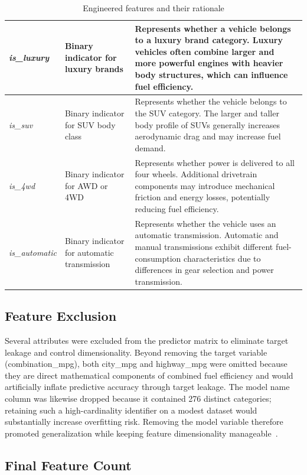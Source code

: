 \begin{table}[H]
{\begin{tabular}{|p{6.0cm}|p{4.5cm}|p{8.5cm}|}
\textit{is\_luxury} &
Binary indicator for luxury brands &
Represents whether a vehicle belongs to a luxury brand category. Luxury vehicles often combine larger and more powerful engines with heavier body structures, which can influence fuel efficiency. \\
\hline

\textit{is\_suv} &
Binary indicator for SUV body class &
Represents whether the vehicle belongs to the SUV category. The larger and taller body profile of SUVs generally increases aerodynamic drag and may increase fuel demand. \\
\hline

\textit{is\_4wd} &
Binary indicator for AWD or 4WD &
Represents whether power is delivered to all four wheels. Additional drivetrain components may introduce mechanical friction and energy losses, potentially reducing fuel efficiency. \\
\hline

\textit{is\_automatic} &
Binary indicator for automatic transmission &
Represents whether the vehicle uses an automatic transmission. Automatic and manual transmissions exhibit different fuel-consumption characteristics due to differences in gear selection and power transmission. \\
\hline

\end{tabular}%
}
\caption{Engineered features and their rationale}
\label{tab:engineered_features}
\end{table}


\subsection{Feature Exclusion}

Several attributes were excluded from the predictor matrix to eliminate target leakage and control dimensionality. Beyond removing the target variable (combination\_mpg), both city\_mpg and highway\_mpg were omitted because they are direct mathematical components of combined fuel efficiency and would artificially inflate predictive accuracy through target leakage. The model name column was likewise dropped because it contained 276 distinct categories; retaining such a high-cardinality identifier on a modest dataset would substantially increase overfitting risk. Removing the model variable therefore promoted generalization while keeping feature dimensionality manageable~\cite{atique2026explainable}.

\subsection{Final Feature Count}

